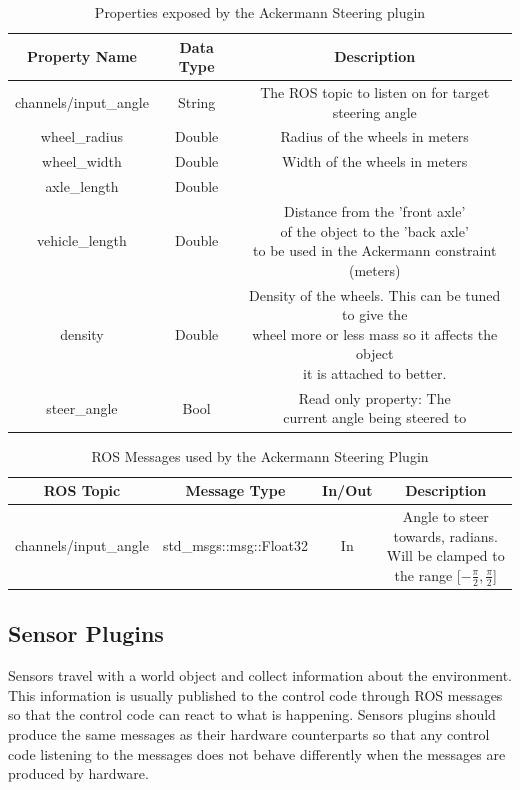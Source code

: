 \begin{itemize}
\begin{table}[h!]
	\centering
	\caption{Properties exposed by the Ackermann Steering plugin}
	\label{tab:ackermann_props}
	\begin{tabular}{c|c|c}
	Property Name & Data Type & Description\\ \hline \hline
	channels/input\_angle & String & The ROS topic to listen on for target steering angle\\ \hline
	wheel\_radius & Double & Radius of the wheels in meters\\ \hline
	wheel\_width & Double & Width of the wheels in meters\\ \hline
	axle\_length & Double & \makecell{Distance between the two wheels (meters)}\\ \hline
	vehicle\_length & Double & \makecell{Distance from the 'front axle'\\ of the object to the 'back axle'\\ to be used in the Ackermann constraint (meters)}\\ \hline
	density & Double & \makecell{Density of the wheels. This can be tuned to give the\\ wheel more or less mass so it affects the object\\ it is attached to better.}\\ \hline
	steer\_angle & Bool & \makecell{Read only property: The\\ current angle being steered to}
	\end{tabular}
\end{table}

\begin{table}[h!]
	\centering
	\caption{ROS Messages used by the Ackermann Steering Plugin}
	\label{tab:ackermann_msgs}
	\begin{tabular}{c|c|c|c}
	ROS Topic & Message Type & In/Out & Description\\ \hline \hline
	channels/input\_angle & std\_msgs::msg::Float32 & In & \makecell{Angle to steer towards, radians.\\ Will be clamped to the range [$-\frac{\pi}{2},\frac{\pi}{2}$]}
	\end{tabular}
\end{table}

\subsection{Sensor Plugins}
Sensors travel with a world object and collect information about the environment. This information is usually published to the control code through ROS messages so that the control code can react to what is happening. Sensors plugins should produce the same messages as their hardware counterparts so that any control code listening to the messages does not behave differently when the messages are produced by hardware.


\end{itemize}
